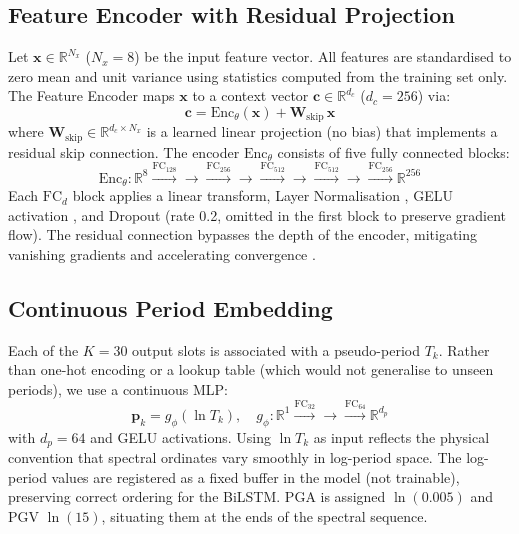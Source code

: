 \documentclass[12pt,a4paper]{article}
\begin{document}
\subsection{Feature Encoder with Residual Projection}

Let $\mathbf{x} \in \mathbb{R}^{N_x}$ ($N_x = 8$) be the input feature vector.
All features are standardised to zero mean and unit variance using statistics
computed from the training set only.
The Feature Encoder maps $\mathbf{x}$ to a context vector
$\mathbf{c} \in \mathbb{R}^{d_c}$ ($d_c = 256$) via:
\begin{equation}
  \mathbf{c} = \mathrm{Enc}_\theta(\mathbf{x}) + \mathbf{W}_\mathrm{skip}\,\mathbf{x}
  \label{eq:encoder}
\end{equation}
where $\mathbf{W}_\mathrm{skip} \in \mathbb{R}^{d_c \times N_x}$ is a learned
linear projection (no bias) that implements a residual skip connection.
The encoder $\mathrm{Enc}_\theta$ consists of five fully connected blocks:
\begin{equation}
  \mathrm{Enc}_\theta:
  \mathbb{R}^{8} \xrightarrow{\mathrm{FC}_{128}} \to
  \xrightarrow{\mathrm{FC}_{256}} \to
  \xrightarrow{\mathrm{FC}_{512}} \to
  \xrightarrow{\mathrm{FC}_{512}} \to
  \xrightarrow{\mathrm{FC}_{256}}
  \mathbb{R}^{256}
\end{equation}
Each $\mathrm{FC}_{d}$ block applies a linear transform, Layer Normalisation
\citep{Ba2016}, GELU activation \citep{Hendrycks2016}, and Dropout (rate 0.2,
omitted in the first block to preserve gradient flow).
The residual connection bypasses the depth of the encoder, mitigating vanishing
gradients and accelerating convergence \citep{He2016}.

\subsection{Continuous Period Embedding}
\label{sec:period_embed}

Each of the $K=30$ output slots is associated with a pseudo-period $T_k$.
Rather than one-hot encoding or a lookup table (which would not generalise to
unseen periods), we use a continuous MLP:
\begin{equation}
  \mathbf{p}_k = g_\phi(\ln T_k), \quad
  g_\phi: \mathbb{R}^1 \xrightarrow{\mathrm{FC}_{32}} \to
          \xrightarrow{\mathrm{FC}_{64}} \mathbb{R}^{d_p}
  \label{eq:period_embed}
\end{equation}
with $d_p = 64$ and GELU activations.
Using $\ln T_k$ as input reflects the physical convention that spectral
ordinates vary smoothly in log-period space.
The log-period values are registered as a fixed buffer in the model (not
trainable), preserving correct ordering for the BiLSTM.
PGA is assigned $\ln(0.005)$ and PGV $\ln(15)$, situating them at the ends of
the spectral sequence.
\end{document}
